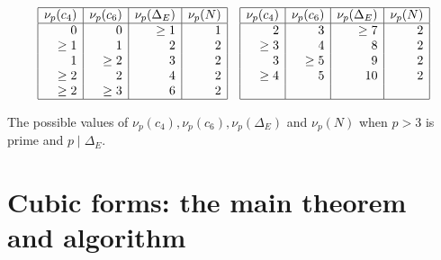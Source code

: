 \documentclass[11pt]{report}
\theoremstyle{definition}
\begin{document}
\begin{table}[h]
$$
\begin{array}{|r|r|r|r|}
\hline
\nu_p (c_4) & \nu_p (c_6) & \nu_p (\Delta_E) & \nu_p (N)  \\ \hline
0 & 0 & \geq 1  & 1  \\
\geq 1 & 1 & 2 & 2  \\
1 & \geq 2 & 3 & 2  \\
\geq 2 & 2 & 4 & 2  \\
\geq 2 & \geq 3 & 6 & 2 \\
\hline
\end{array}
\quad
\begin{array}{|r|r|r|r|}
\hline
\nu_p (c_4) & \nu_p (c_6) & \nu_p (\Delta_E) & \nu_p (N)  \\ \hline
 2 & 3 & \geq 7 & 2 \\
 \geq 3 & 4 & 8 & 2 \\
 3 & \geq 5 & 9 & 2 \\
 \geq 4 & 5 & 10 & 2 \\
  &  &  &  \\
\hline
\end{array}
$$

\caption{The possible values of $\nu_p(c_4), \nu_p(c_6), \nu_p(\Delta_E)$ and $\nu_p(N)$ when $p > 3$ is prime and
$p\mid \Delta_E$.}
\label{tab nup}
\end{table}


\section{Cubic forms: the main theorem and algorithm}
\label{sec:cubic-forms:-main-1}
\end{document}
